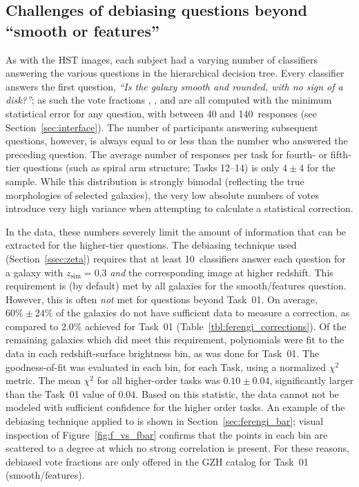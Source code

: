\documentclass[twocolumn]{aastex6}
\begin{document}
\subsection{Challenges of debiasing questions beyond ``smooth or features''}\label{ssec:higher_order_tasks}

As with the HST images, each \ferengi{} subject had a varying number of classifiers
answering the various questions in the hierarchical decision tree. Every classifier
answers the first question, {\it ``Is the galaxy smooth and rounded, with no
sign of a disk?''}; as such the vote fractions \fsmooth, \ffeatures, and
\fartifact{} are all computed with the minimum statistical error for any
question, with between 40 and 140~responses (see Section~\ref{sec:interface}).
The number of participants answering subsequent questions, however, is always equal
to or less than the number who answered the preceding question. The average number
of responses per task for fourth- or fifth-tier questions (such as spiral arm
structure; Tasks 12--14) is only $4\pm4$ for the \ferengi{} sample. While this
distribution is strongly bimodal (reflecting the true morphologies of
selected galaxies), the very low absolute numbers of votes introduce very high
variance when attempting to calculate a statistical correction.

In the \ferengi{} data, these numbers severely limit the amount of information
that can be extracted for the higher-tier questions. The debiasing technique
used (Section~\ref{ssec:zeta}) requires that at least 10~classifiers answer each
question for a galaxy with $z_\mathrm{sim}=0.3$ \emph{and} the corresponding
image at higher redshift. This requirement is (by default) met by all galaxies
for the smooth/features question. However, this is often \emph{not} met for
questions beyond Task~01. On average, $60\%\pm24\%$ of the galaxies do not have
sufficient data to measure a correction, as compared to 2.0\% achieved for
Task~01 (Table~\ref{tbl:ferengi_corrections}). Of the remaining
\ferengi{} galaxies which did meet this requirement, polynomials were fit to
the data in each redshift-surface brightness bin, as was done for Task~01. The
goodness-of-fit was evaluated in each bin, for each Task, using a normalized
$\chi^2$ metric. The mean $\chi^2$ for all higher-order tasks was
$0.10\pm0.04$, significantly larger than the Task~01 value of $0.04$. Based on
this statistic, the data cannot not be modeled with sufficient confidence for
the higher order tasks. An example of the debiasing technique applied to
\fbar{} is shown in Section~\ref{sec:ferengi_bar}; visual inspection of
Figure~\ref{fig:f_vs_fbar} confirms that the points in each bin are scattered
to a degree at which no strong correlation is present.  For these reasons,
debiased vote fractions are only offered in the GZH catalog for Task~01
(smooth/features).  
\end{document}
